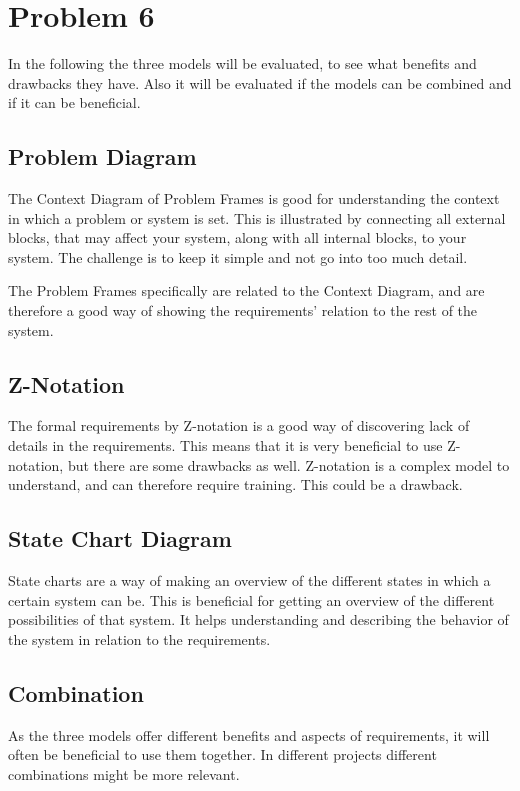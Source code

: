 \chapter{Problem 6}

In the following the three models will be evaluated, to see what benefits and drawbacks they have. Also it will be evaluated if the models can be combined and if it can be beneficial.

\section{Problem Diagram}
The Context Diagram of Problem Frames is good for understanding the context in which a problem or system is set. This is illustrated by connecting all external blocks, that may affect your system, along with all internal blocks, to your system. The challenge is to keep it simple and not go into too much detail.

The Problem Frames specifically are related to the Context Diagram, and are therefore a good way of showing the requirements' relation to the rest of the system.


\section{Z-Notation}
The formal requirements by Z-notation is a good way of discovering lack of details in the requirements.  This means that it is very beneficial to use Z-notation, but there are some drawbacks as well. Z-notation is a complex model to understand, and can therefore require training. This could be a drawback.




\section{State Chart Diagram}
State charts are a way of making an overview of the different states in which a certain system can be. This is beneficial for getting an overview of the different possibilities of that system. It helps understanding and describing the behavior of the system in relation to the requirements.

\section{Combination}
As the three models offer different benefits and aspects of requirements, it will often be beneficial to use them together. In different projects different combinations might be more relevant.